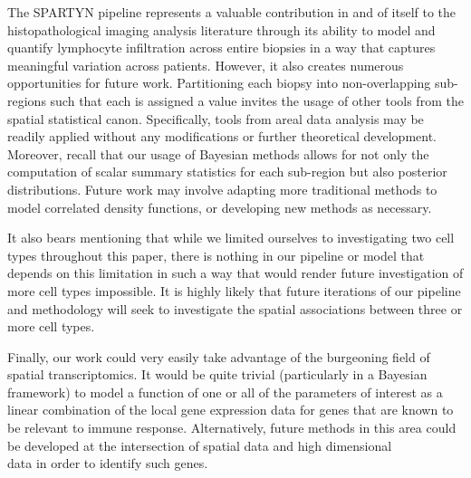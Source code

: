 \documentclass[
]{book}
\begin{document}
The SPARTYN pipeline represents a valuable contribution in and of itself
to the histopathological imaging analysis literature through its ability
to model and quantify lymphocyte infiltration across entire biopsies in
a way that captures meaningful variation across patients. However, it
also creates numerous opportunities for future work. Partitioning each
biopsy into non-overlapping sub-regions such that each is assigned a
value invites the usage of other tools from the spatial statistical
canon. Specifically, tools from areal data analysis may be readily
applied without any modifications or further theoretical development.
Moreover, recall that our usage of Bayesian methods allows for not only
the computation of scalar summary statistics for each sub-region but
also posterior distributions. Future work may involve adapting more
traditional methods to model correlated density functions, or developing
new methods as necessary.

It also bears mentioning that while we limited ourselves to
investigating two cell types throughout this paper, there is nothing in
our pipeline or model that depends on this limitation in such a way that
would render future investigation of more cell types impossible. It is
highly likely that future iterations of our pipeline and methodology
will seek to investigate the spatial associations between three or more
cell types.

Finally, our work could very easily take advantage of the burgeoning
field of spatial transcriptomics. It would be quite trivial
(particularly in a Bayesian framework) to model a function of one or all
of the parameters of interest as a linear combination of the local gene
expression data for genes that are known to be relevant to immune
response. Alternatively, future methods in this area could be developed
at the intersection of spatial data and high dimensional\\
data in order to identify such genes.

  
\end{document}
